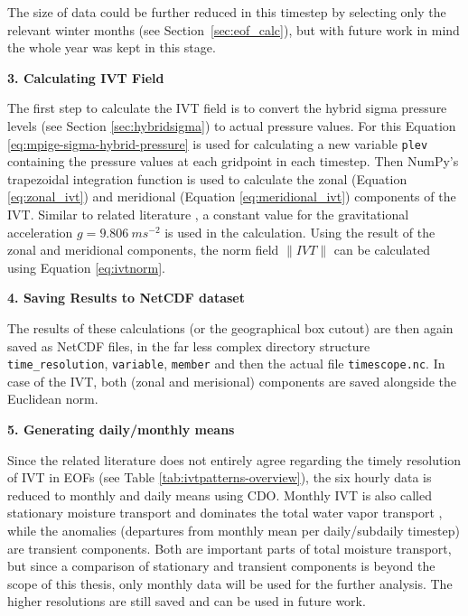 The size of data could be further reduced in this timestep by selecting only the relevant winter months (see Section~\ref{sec:eof_calc}), but with future work in mind the whole year was kept in this stage. 

\textbf{3. Calculating IVT Field}

The first step to calculate the IVT field is to convert the hybrid sigma pressure levels (see Section \ref{sec:hybridsigma}) to actual pressure values. 
For this Equation \ref{eq:mpige-sigma-hybrid-pressure} is used for calculating a new variable \texttt{plev} containing the pressure values at each gridpoint in each timestep. 
Then NumPy's trapezoidal integration function is used to calculate the zonal (Equation \ref{eq:zonal_ivt}) and meridional (Equation \ref{eq:meridional_ivt}) components of the IVT. 
Similar to related literature \cite{ayantobo_integrated_2022}, a constant value for the gravitational acceleration $g = 9.806~ms^{-2}$ is used in the calculation. 
Using the result of the zonal and meridional components, the norm field $\lVert IVT \rVert$ can be calculated using Equation \ref{eq:ivtnorm}. 



\textbf{4. Saving Results to NetCDF dataset}

The results of these calculations (or the geographical box cutout) are then again saved as NetCDF files, in the far less complex directory structure \texttt{time\_resolution}, \texttt{variable}, \texttt{member} and then the actual file \texttt{timescope.nc}. 
In case of the IVT, both (zonal and merisional) components are saved alongside the Euclidean norm. 


\textbf{5. Generating daily/monthly means}

Since the related literature does not entirely agree regarding the timely resolution of IVT in EOFs (see Table \ref{tab:ivtpatterns-overview}), the six hourly data is reduced to monthly and daily means using CDO.
Monthly IVT is also called stationary moisture transport and dominates the total water vapor transport \cite{zhou_atmospheric_2005}, while the anomalies (departures from monthly mean per daily/subdaily timestep) are transient components.
Both are important parts of total moisture transport, but since a comparison of stationary and transient components is beyond the scope of this thesis, only monthly data will be used for the further analysis. 
The higher resolutions are still saved and can be used in future work. 

